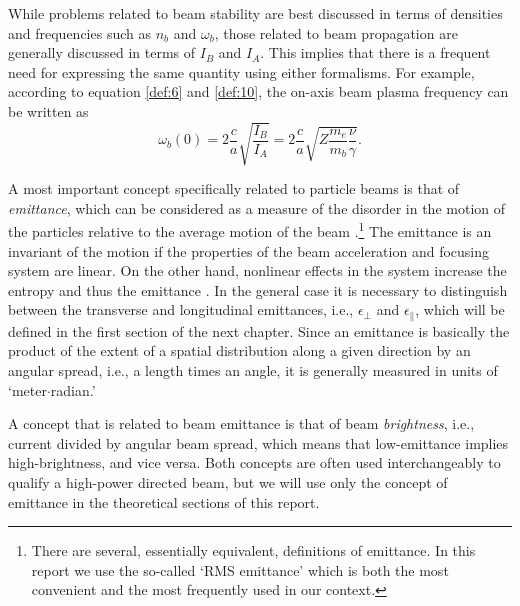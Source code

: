 \documentclass [12pt,a4paper,     ]{report} %
\begin{document}
   While problems related to beam stability are best discussed in terms of  densities and frequencies such as $n_b$ and $\omega_b$, those related to beam propagation are generally discussed in terms of $I_B$ and $I_A$.  This implies that there is a frequent need for expressing the same quantity using either formalisms.  For example, according to equation \eqref{def:6} and \eqref{def:10}, the on-axis beam plasma frequency can be written as
%
\begin{equation}\label{def:11} %
       \omega_b(0) = 2 \frac{c}{a} \sqrt{\frac{I_B}{I_A}}
                   = 2 \frac{c}{a} \sqrt{Z\frac{m_e}{m_b}\frac{\nu}{\gamma}}.
\end{equation}
%



   A most important concept specifically related to particle beams is that of \emph{emittance}, which can be considered as a measure of the disorder in the  motion of the particles relative to the average motion of the beam \cite{LAWSO1973-}.\footnote{There are several, essentially equivalent, definitions of emittance. In this report we use the so-called `RMS emittance' which is both the most convenient and the most frequently used in our context.}   The emittance is an invariant of the motion if the properties of the beam acceleration and focusing system are linear.  On the other hand, nonlinear effects in the system increase the entropy and thus the emittance \cite{RHEE-1986-}.   In the general case it is necessary to distinguish between the transverse and longitudinal emittances, i.e., $\epsilon_{\perp}$ and $\epsilon_{\|}$, which will be defined in the first section of the next chapter.  Since an emittance is basically the product of the extent of a spatial distribution along a given direction by an angular spread, i.e., a length times an angle, it is generally measured in units of `meter$\cdot$radian.'

   A concept that is related to beam emittance is that of beam \emph{brightness}, i.e., current divided by angular beam spread, which means that low-emittance implies high-brightness, and vice versa.  Both concepts are often used interchangeably to qualify a high-power directed beam, but we will use only the concept of emittance in the theoretical sections of this report.
\end{document}
